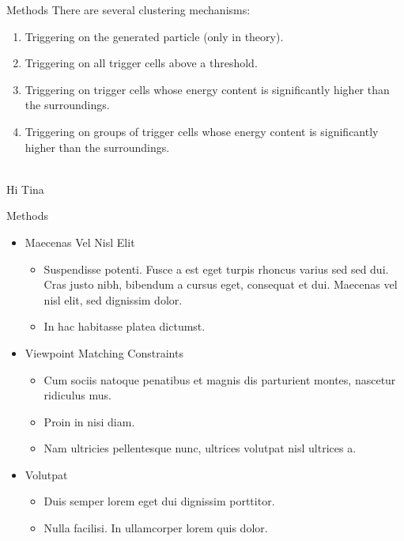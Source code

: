 \documentclass[final,hyperref={pdfpagelabels=false}]{beamer}
\begin{document}
\begin{frame}[t]
\begin{columns}[t]
\begin{column}{.465\textwidth}
\begin{block}{Methods}
	There are several clustering mechanisms:
	\begin{enumerate}
		\item Triggering on the generated particle (only in theory).
		\item Triggering on all trigger cells above a threshold.
		\item Triggering on trigger cells whose energy content is significantly higher than the surroundings.
		\item Triggering on groups of trigger cells whose energy content is significantly higher than the surroundings.
	\end{enumerate}
	
	\\
	Hi Tina \\
	

\end{block}


\begin{block}{Methods}

\begin{itemize}
\item Maecenas Vel Nisl Elit
\begin{itemize}
\item Suspendisse potenti. Fusce a est eget turpis rhoncus varius sed sed dui. Cras justo nibh, bibendum a cursus eget, consequat et dui. Maecenas vel nisl elit, sed dignissim dolor. 
\item In hac habitasse platea dictumst.
\end{itemize}

\item Viewpoint Matching Constraints
\begin{itemize}
\item Cum sociis natoque penatibus et magnis dis parturient montes, nascetur ridiculus mus. 
\item Proin in nisi diam.
\item Nam ultricies pellentesque nunc, ultrices volutpat nisl ultrices a.
\end{itemize}

\item Volutpat 
\begin{itemize}
\item Duis semper lorem eget dui dignissim porttitor.
\item Nulla facilisi. In ullamcorper lorem quis dolor.
\end{itemize}
\end{itemize}


\end{block}
\end{column}
\end{columns}
\end{frame}
\end{document}
